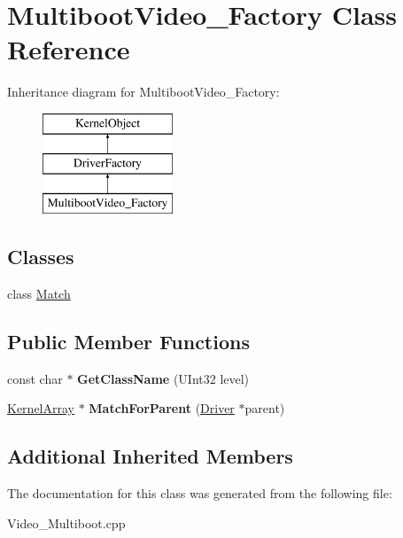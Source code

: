 \hypertarget{class_multiboot_video___factory}{}\section{Multiboot\+Video\+\_\+\+Factory Class Reference}
\label{class_multiboot_video___factory}
Inheritance diagram for Multiboot\+Video\+\_\+\+Factory\+:\begin{figure}[H]
\begin{center}
\leavevmode
\includegraphics[height=3.000000cm]{class_multiboot_video___factory}
\end{center}
\end{figure}
\subsection*{Classes}
\begin{DoxyCompactItemize}
\item 
class \hyperlink{class_multiboot_video___factory_1_1_match}{Match}
\end{DoxyCompactItemize}
\subsection*{Public Member Functions}
\begin{DoxyCompactItemize}
\item 
\mbox{\label{class_multiboot_video___factory_a0c0dd8d58ab03ca25f38508b862e8f74}} 
const char $\ast$ {\bfseries Get\+Class\+Name} (U\+Int32 level)
\item 
\mbox{\label{class_multiboot_video___factory_ad3e5a57c211de3fd377b406d7ee6ecf8}} 
\hyperlink{class_kernel_array}{Kernel\+Array} $\ast$ {\bfseries Match\+For\+Parent} (\hyperlink{class_driver}{Driver} $\ast$parent)
\end{DoxyCompactItemize}
\subsection*{Additional Inherited Members}


The documentation for this class was generated from the following file\+:\begin{DoxyCompactItemize}
\item 
Video\+\_\+\+Multiboot.\+cpp\end{DoxyCompactItemize}
